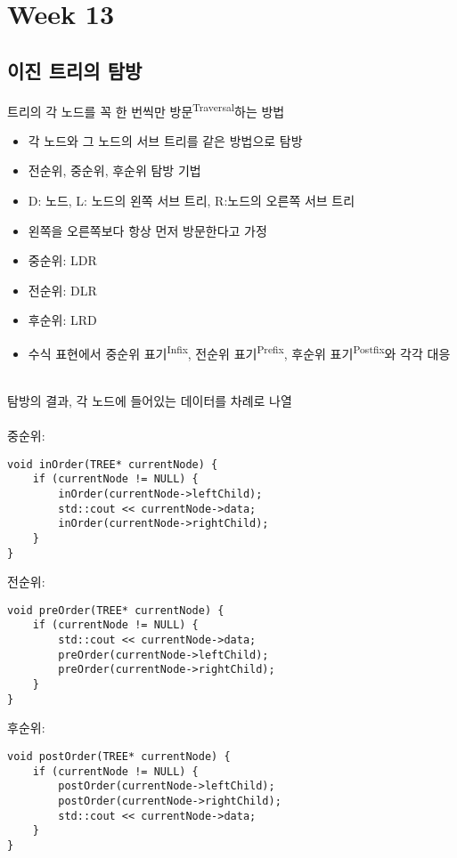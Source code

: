 \newpage
\section{Week 13}
\subsection{이진 트리의 탐방}
트리의 각 노드를 꼭 한 번씩만 방문\textsuperscript{Traversal}하는 방법
\begin{itemize}
    \item 각 노드와 그 노드의 서브 트리를 같은 방법으로 탐방
    \item 전순위, 중순위, 후순위 탐방 기법
    \item D: 노드, L: 노드의 왼쪽 서브 트리, R:노드의 오른쪽 서브 트리
    \item 왼쪽을 오른쪽보다 항상 먼저 방문한다고 가정
    \item 중순위: LDR
    \item 전순위: DLR
    \item 후순위: LRD
    \item 수식 표현에서 중순위 표기\textsuperscript{Infix}, 전순위 표기\textsuperscript{Prefix}, 후순위 표기\textsuperscript{Postfix}와 각각 대응
\end{itemize}\phantom{}\\
탐방의 결과, 각 노드에 들어있는 데이터를 차례로 나열\\\\
중순위:
\begin{verbatim}
void inOrder(TREE* currentNode) {
    if (currentNode != NULL) {
        inOrder(currentNode->leftChild);
        std::cout << currentNode->data;
        inOrder(currentNode->rightChild);
    }
}
\end{verbatim}
전순위:
\begin{verbatim}
void preOrder(TREE* currentNode) {
    if (currentNode != NULL) {
        std::cout << currentNode->data;
        preOrder(currentNode->leftChild);
        preOrder(currentNode->rightChild);
    }
}
\end{verbatim}
후순위:
\begin{verbatim}
void postOrder(TREE* currentNode) {
    if (currentNode != NULL) {
        postOrder(currentNode->leftChild);
        postOrder(currentNode->rightChild);
        std::cout << currentNode->data;
    }
}
\end{verbatim}

